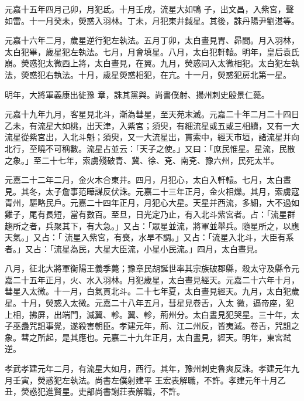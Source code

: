 \begin{pinyinscope}
 元嘉十五年四月己卯，月犯氐。十月壬戌，流星大如鴨
 子，出文昌，入紫宮，聲如雷。十一月癸未，熒惑入羽林。丁未，月犯東井鉞星。其後，誅丹陽尹劉湛等。



 元嘉十六年二月，歲星逆行犯左執法。五月丁卯，太白晝見胃、昴間。月入羽林，太白犯畢，歲星犯左執法。七月，月會填星。八月，太白犯軒轅。明年，皇后袁氏崩。熒惑犯太微西上將，太白晝見，在翼。九月，熒惑同入太微相犯。太白犯左執法，熒惑犯右執法。十月，歲星熒惑相犯，在亢。十一月，熒惑犯房北第一星。



 明年，大將軍義康出徙豫
 章，誅其黨與。尚書僕射、揚州刺史殷景仁薨。



 元嘉十九年九月，客星見北斗，漸為彗星，至天苑末滅。元嘉二十年二月二十四日乙未，有流星大如桃，出天津，入紫宮；須臾，有細流星或五或三相續，又有一大流星從紫宮出，入北斗魁；須臾，又一大流星出，貫索中，經天市垣，諸流星并向北行，至曉不可稱數。流星占並云：「天子之使。」又曰：「庶民惟星。星流，民散之象。」至二十七年，索虜殘破青、冀、徐、兗、南兗、豫六州，民死太半。



 元嘉二十二年二月，金火木合東井。四月，月犯心，太白入軒轅。七月，太白晝見。其冬，太子詹事范曄謀反伏誅。元嘉二十三年正月，金火相爍。其月，索虜寇青州，驅略民戶。元嘉二十四年正月，月犯心大星。天星并西流，多細，大不過如雞子，尾有長短，當有數百。至旦，日光定乃止，有入北斗紫宮者。占：「流星群趨所之者，兵聚其下，有大急。」又占：「眾星並流，將軍並舉兵。隨星所之，以應天氣。」又占：「
 流星入紫宮，有喪，水旱不調。」又占：「流星入北斗，大臣有系者。」又占：「流星為民，大星大臣流，小星小民流。」四月，太白晝見。



 八月，征北大將軍衡陽王義季薨；豫章民胡誕世率其宗族破郡縣，殺太守及縣令元嘉二十五年正月，火、水入羽林。月犯歲星，太白晝見經天。元嘉二十六年十月，彗星入太微。十一月，白氣貫北斗。二十七年夏，太白晝見經天。九月，太白犯歲星。十月，熒惑入太微。元嘉二十八年五月，彗星見卷舌，入太
 微，逼帝座，犯上相，拂屏，出端門，滅翼、軫。翼、軫，荊州分。太白晝見犯哭星。三十年，太子巫蠱咒詛事覺，遂殺害朝臣。孝建元年，荊、江二州反，皆夷滅。卷舌，咒詛之象。彗之所起，是其應也。元嘉二十九年正月，太白晝見，經天。明年，東宮弒逆。



 孝武孝建元年二月，有流星大如月，西行。其年，豫州刺史魯爽反誅。孝建元年九月壬寅，熒惑犯左執法。尚書左僕射建平
 王宏表解職，不許。孝建元年十月乙丑，熒惑犯進賢星。吏部尚書謝莊表解職，不許。




\end{pinyinscope}
